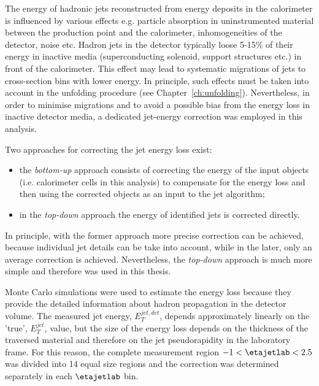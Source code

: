 The energy of hadronic jets reconstructed from energy deposits in the calorimeter is influenced by various effects e.g. particle absorption in uninstrumented material between the production point and the calorimeter, inhomogeneities of the detector, noise etc. Hadron jets in the \zeus detector typically loose 5-15\% of their energy in inactive media (superconducting solenoid, support structures etc.) in front of the calorimeter. This effect may lead to systematic migrations of jets to cross-section bins with lower energy. In principle, such effects must be taken into account in the unfolding procedure (see Chapter~\ref{ch:unfolding}). Nevertheless, in order to minimise migrations and to avoid a possible bias from the energy loss in inactive detector media, a dedicated jet-energy correction was employed in this analysis.

Two approaches for correcting the jet energy loss exist:
\begin{itemize}
 \item the \emph{bottom-up} approach consists of correcting the energy of the input objects (i.e. calorimeter cells in this analysis) to compensate for the energy loss and then using the corrected objects as an input to the jet algorithm;
 \item in the \emph{top-down} approach the energy of identified jets is corrected directly.
\end{itemize}
In principle, with the former approach more precise correction can be achieved, because individual jet details can be take into account, while in the later, only an average correction is achieved. Nevertheless, the \emph{top-down} approach is much more simple and therefore was used in this thesis.

Monte Carlo simulations were used to estimate the energy loss because they provide the detailed information about hadron propagation in the detector volume. The measured jet energy, $E_T^{jet,det}$, depends approximately linearly on the 'true', $E_T^{jet}$, value, but the size of the energy loss depends on the thickness of the traversed material and therefore on the jet pseudorapidity in the laboratory frame. For this reason, the complete measurement region $-1<\etajetlab<2.5$ was divided into 14 equal size regions and the correction was determined separately in each $\etajetlab$ bin.

